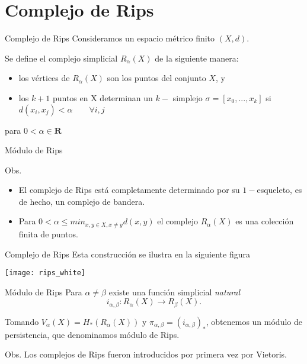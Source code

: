 \documentclass{beamer}
\begin{document}
\section{Complejo de Rips}

\begin{frame}{Complejo de Rips}
    Consideramos un espacio métrico finito $(X, d)$. 

    Se define el complejo simplicial $R_{\alpha}(X)$ de la siguiente manera: 
    \begin{itemize}
        \item los vértices de $R_{\alpha}(X)$ son los puntos del conjunto $X$, y  
        \pause
        \item los $k+1$ puntos en X determinan un $k-$ simplejo $\sigma = [x_{0},...,x_{k}]$ si $d(x_{i}, x_{j})< \alpha \qquad \forall i, j$
    \end{itemize}
    para $0 < \alpha\in \mathbf{R}$  
\end{frame}

\begin{frame}{Módulo de Rips}
    \begin{block}{Obs.}
        \begin{itemize}
            \item El complejo de Rips está completamente determinado por su $1-$esqueleto, es de hecho, un complejo de bandera.

            \pause
            \item Para $0<\alpha\leq min_{x, y\in X, x\neq y}d(x, y)$ el complejo $R_{\alpha}(X)$ es una colección finita de puntos.
        \end{itemize}
        
    \end{block}
\end{frame}

\begin{frame}{Complejo de Rips}
    Esta construcción se ilustra en la siguiente figura 
    
    \texttt{[image: rips\_white]}
    
\end{frame}

\begin{frame}{Módulo de Rips}
    Para $\alpha \neq \beta$ existe una función  simplicial \textit{natural}
    $$i_{\alpha, \beta}: R_{\alpha}(X) \to R_{\beta}(X).$$ 
    \pause
    
    Tomando $V_{\alpha}(X) = H_{\ast}(R_{\alpha}(X))$ y $\pi_{\alpha,\beta} = (i_{\alpha,\beta})_{\ast}$, obtenemos un módulo de persistencia, que denominamos módulo de Rips.
    \pause
    
    \begin{block}{Obs.}
        Los complejos de Rips fueron introducidos por primera vez por Vietoris.
    \end{block}

\end{frame}
\end{document}
